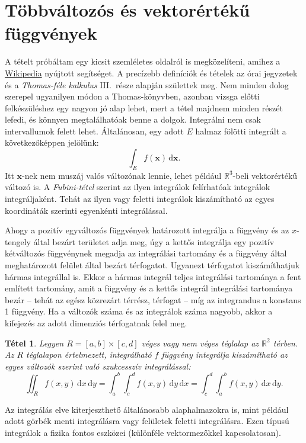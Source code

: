 \documentclass[DIV=15,appendixprefix]{scrreprt}
\newtheorem*{tetel}{Tétel}
\theoremstyle{definition}
\theoremstyle{remark}
\begin{document}
\section{Többváltozós és vektorértékű függvények}
A tételt próbáltam egy kicsit szemléletes oldalról is megközelíteni, amihez a
\href{https://www.wikipedia.org/}{Wikipedia} nyújtott
segítséget. A precízebb definíciók és tételek az órai jegyzetek és a \emph{Thomas-féle kalkulus}
III.~része \cite[16.~fejezet]{Thomas} alapján születtek meg. Nem minden dolog szerepel ugyanilyen
módon a Thomas-könyvben, azonban vizsga előtti felkészüléshez egy nagyon jó alap lehet, mert a tétel
majdnem minden részét lefedi, és könnyen megtalálhatóak benne a dolgok.
%
Integrálni nem csak intervallumok felett lehet. Általánosan, egy adott $ E $ halmaz fölötti
integrált a következőképpen jelölünk:
\begin{equation*}
	\int_{ E } f \left( \mathbf{ x } \right) \, \mathrm{ d } \mathbf{ x }.
\end{equation*}
Itt $ \mathbf{ x } $-nek nem muszáj valós változónak lennie, lehet például
$ \mathbb{ R }^{ 3 }$-beli vektorértékű változó is. A \emph{Fubini-tétel} szerint az ilyen
integrálok felírhatóak integrálok integráljaként. Tehát az ilyen  vagy
 feletti integrálok kiszámítható az egyes koordináták szerinti egyenkénti
integrálással.

Ahogy a pozitív egyváltozós függvények határozott integrálja a függvény és az $ x $-tengely által
bezárt területet adja meg, úgy a kettős integrálja egy pozitív kétváltozós függvénynek megadja az
integrálási tartomány és a függvény által meghatározott felület által bezárt térfogatot. Ugyanezt
térfogatot kiszámíthatjuk hármas integrállal is. Ekkor a hármas integrál teljes integrálási
tartománya a fent említett tartomány, amit a függvény és a kettős integrál integrálási tartománya
bezár -- tehát az egész közrezárt térrész, térfogat -- míg az integrandus a konstans 1 függvény. Ha
a változók száma és az integrálok száma nagyobb, akkor a kifejezés az adott dimenziós térfogatnak
felel meg.

\begin{tetel}
	Legyen $ R = \left[ a,{} b \right] \times \left[ c,{} d \right]$ véges vagy nem véges téglalap
	az $ \mathbb{ R }^{ 2 } $ térben. Az $ R $ téglalapon értelmezett, integrálható $ f $ függvény
	integrálja kiszámítható az egyes változók szerint való szukcesszív integrálással:
	\begin{equation*}
		\iint_{ R } f \left( x,{} y  \right) \, \mathrm{ d } x \, \mathrm{ d } y = \int_{ a }^{ b }
		\int_{ c }^{ d } f \left( x,{} y  \right) \, \mathrm{ d } y \, \mathrm{ d } x =
		\int_{ c }^{ d } \int_{ a }^{ b } f \left( x,{} y  \right) \, \mathrm{ d } x \,
		\mathrm{ d } y.
	\end{equation*}
\end{tetel}
%
Az integrálás elve kiterjeszthető általánosabb alaphalmazokra is, mint például adott görbék menti
integrálásra vagy felületek feletti integrálásra. Ezen típusú integrálok a fizika fontos eszközei
(különféle vektormezőkkel kapcsolatosan).
\end{document}

